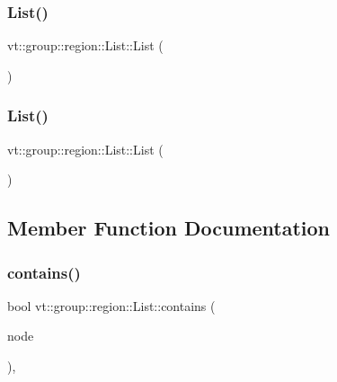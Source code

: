 \subsubsection{\texorpdfstring{List()}{List()}\hspace{0.1cm}{\footnotesize\ttfamily [5/6]}}
{\footnotesize\ttfamily vt\+::group\+::region\+::\+List\+::\+List (\begin{DoxyParamCaption}\item[{\hyperlink{structvt_1_1group_1_1region_1_1_list}{List} const \&}]{ }\end{DoxyParamCaption})\hspace{0.3cm}{\ttfamily [default]}}

\mbox{\label{structvt_1_1group_1_1region_1_1_list_a832f5f93b9542d7a961d0398e1f6cf10}} 
\subsubsection{\texorpdfstring{List()}{List()}\hspace{0.1cm}{\footnotesize\ttfamily [6/6]}}
{\footnotesize\ttfamily vt\+::group\+::region\+::\+List\+::\+List (\begin{DoxyParamCaption}\item[{\hyperlink{structvt_1_1group_1_1region_1_1_list}{List} \&\&}]{ }\end{DoxyParamCaption})\hspace{0.3cm}{\ttfamily [default]}}



\subsection{Member Function Documentation}
\mbox{\label{structvt_1_1group_1_1region_1_1_list_ac85ec02f77a44a2dadc1b51231e113a7}} 
\subsubsection{\texorpdfstring{contains()}{contains()}}
{\footnotesize\ttfamily bool vt\+::group\+::region\+::\+List\+::contains (\begin{DoxyParamCaption}\item[{\hyperlink{namespacevt_a866da9d0efc19c0a1ce79e9e492f47e2}{Node\+Type} const \&}]{node }\end{DoxyParamCaption})\hspace{0.3cm}{\ttfamily [override]}, {\ttfamily [virtual]}}



